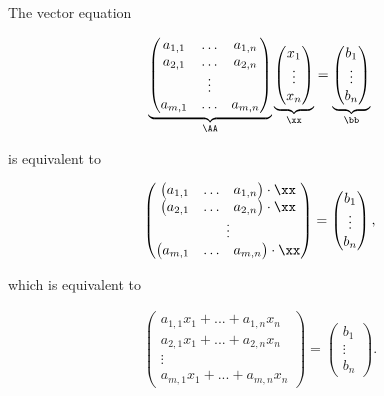 \begin{deriv}
    The vector equation
    
    \begin{align*}
        \underbrace
        {\begin{pmatrix}
            a_{1, 1} & \hdots & a_{1, n} \\
            a_{2, 1} & \hdots & a_{2, n} \\
            & \vdots & \\
            a_{m, 1} & \hdots & a_{m, n} \\
        \end{pmatrix}}_{\AA}
        \underbrace{
        \begin{pmatrix}
            x_1 \\ \vdots \\ x_n
        \end{pmatrix}}_{\xx}
        =
        \underbrace
        {\begin{pmatrix}
            b_1 \\ \vdots \\ b_n
        \end{pmatrix}}_{\bb}
    \end{align*}
    
    is equivalent to
    
\begin{align*}
        \begin{pmatrix}
            \begin{pmatrix} a_{1, 1} & \hdots & a_{1, n} \end{pmatrix} \cdot \xx \\
            \begin{pmatrix} a_{2, 1} & \hdots & a_{2, n} \end{pmatrix} \cdot \xx \\
            \vdots \\
            \begin{pmatrix} a_{m, 1} & \hdots & a_{m, n} \end{pmatrix} \cdot \xx
        \end{pmatrix}
        =
        \begin{pmatrix}
            b_1 \\ \vdots \\ b_n
        \end{pmatrix},
\end{align*}

which is equivalent to

\begin{align*}
    \begin{pmatrix}
            a_{1, 1} x_1 + ... + a_{1, n} x_n \\
            a_{2, 1} x_1 + ... + a_{2, n} x_n \\
            \vdots \\
            a_{m, 1} x_1 + ... + a_{m, n} x_n
        \end{pmatrix}
        =
        \begin{pmatrix}
            b_1 \\ \vdots \\ b_n
        \end{pmatrix}.
\end{align*}


\end{deriv}
